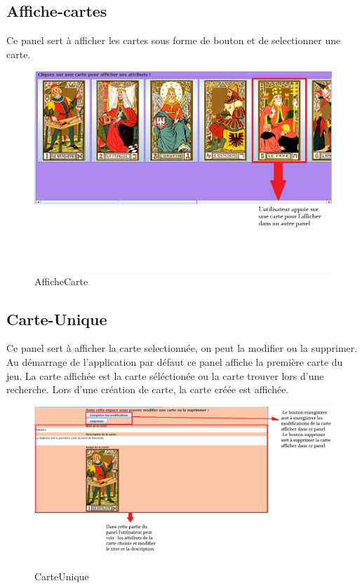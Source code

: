 \documentclass{article}
\begin{document}
\subsection{Affiche-cartes}
Ce panel sert à afficher les cartes sous forme de bouton et de selectionner une carte.
\begin{figure}[!h]
\includegraphics[scale=0.80]{AfficheCartes.PNG}
\caption{AfficheCarte}
\label{fig:AfficheCartes}
\end{figure}

\newpage
\subsection{Carte-Unique}
Ce panel sert à afficher la carte selectionnée, on peut la modifier ou la supprimer.
Au démarrage de l'application par défaut ce panel affiche la première carte du jeu.
La carte affichée est la carte séléctionée ou la carte trouver lors d'une recherche.
Lors d'une création de carte, la carte créée est affichée.

\begin{figure}[!h]

\includegraphics[scale=0.72]{CarteUnique.PNG}
\caption{CarteUnique}
\label{fig:CarteUnique}
\end{figure}
\end{document}
